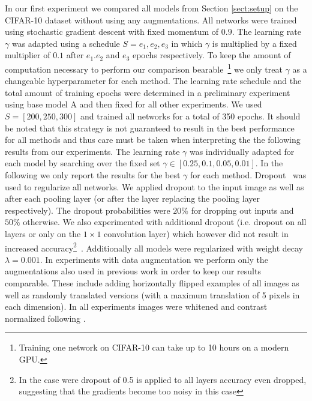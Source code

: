 \documentclass{article} \usepackage{iclr2015,times}
\begin{document}
In our first experiment we compared all models from Section
\ref{sect:setup} on the CIFAR-10 dataset without using any
augmentations. All networks were trained using stochastic gradient
descent with fixed momentum of $0.9$. The learning rate $\gamma$ was adapted
using a schedule $S = {e_1, e_2, e_3}$ in which $\gamma$ is multiplied by a fixed multiplier
of $0.1$ after $e_1. e_2$ and $e_3$ epochs respectively. 
To keep the amount of computation necessary to perform
our comparison bearable~\footnote{Training one network on CIFAR-10 can
  take up to 10 hours on a modern GPU.} we only treat $\gamma$ as a
changeable hyperparameter for each method. The learning rate schedule
and the total amount of training epochs were determined in a preliminary
experiment using base model A and then fixed for all other
experiments. We used $S = [200, 250, 300]$ and trained all networks
for a total of 350 epochs. It should be noted that this strategy is not guaranteed to result in the best
performance for all methods and thus care must be taken when
interpreting the the following results from our experiments.
The learning rate $\gamma$ was individually adapted for each model by
searching over the fixed set $\gamma \in [0.25, 0.1, 0.05,
0.01]$. In the following we only report the results for the best
$\gamma$ for each method. 
Dropout~\citep{Hinton_arxiv2012} was used to regularize all networks. We
applied dropout to the input image as well as after each pooling layer
(or after the layer replacing the pooling layer respectively). The
dropout probabilities were $20 \%$ for dropping out inputs and $50 \%$
otherwise. We also experimented with additional dropout (i.e. dropout
on all layers or only on the $1\times1$ convolution layer) which
however did not result in increased accuracy\footnote{In the case were
dropout of 0.5 is applied to all layers accuracy even dropped,
suggesting that the gradients become too noisy in this case}~. 
Additionally all models were regularized with weight decay $\lambda =
0.001$. In experiments with data augmentation we perform only the
augmentations also used in previous work
\citep{Goodfellow2013,Lin_2014} in order to keep our results
comparable. These include adding horizontally flipped examples of
all images as well as randomly translated versions (with a maximum
translation of 5 pixels in each dimension). In all experiments images
were whitened and contrast normalized following \citet{Goodfellow2013}.
\end{document}
